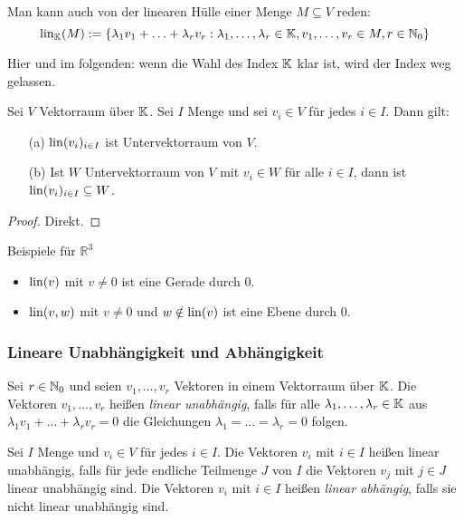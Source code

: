 Man kann auch von der linearen Hülle einer Menge $ M \subseteq V $ reden:
\begin{equation}
\operatorname{lin}_\mathbb K(M) := \{ \lambda_1 v_1 + \ldots + \lambda_r v_r : \lambda_1, \ldots, \lambda_r \in \mathbb K, v_1, \ldots, v_r \in M, r \in \mathbb N_0 \}
\end{equation}

Hier und im folgenden: wenn die Wahl des Index $ \mathbb K $ klar ist, wird der Index weg gelassen.


\begin{propn}
	Sei $ V $ Vektorraum über $ \mathbb K $. Sei $ I $ Menge und sei $ v_i \in V $ für jedes $ i \in I $. Dann gilt:
	\begin{itemize}
		\item[(a)]
			$ \operatorname{lin} (v_i)_{i \in I} $ ist Untervektorraum von $ V $.
		\item[(b)]
			Ist $ W $ Untervektorraum von $ V $ mit $ v_i \in W $ für alle $ i \in I $, dann ist $ \operatorname{lin} (v_i)_{i \in I} \subseteq W $.
	\end{itemize}
\end{propn}
\begin{proof}
	Direkt.
\end{proof}


\begin{bsp} Beispiele für $ \mathbb{R}^3 $
\begin{itemize}
	\item
		$ \operatorname{lin} (v) $ mit $ v \neq 0 $ ist eine Gerade durch $ 0 $.
	\item
		$ \operatorname{lin} (v,w) $ mit $ v \neq 0 $ und $ w \notin \operatorname{lin}(v) $ ist eine Ebene durch $ 0 $.
\end{itemize}
\end{bsp} 


\subsubsection{Lineare Unabhängigkeit und Abhängigkeit}

Sei $ r \in \mathbb N_0 $ und seien $ v_1, \ldots, v_r $ Vektoren in einem Vektorraum über $ \mathbb K $. Die Vektoren $ v_1, \ldots, v_r $ heißen \emph{linear unabhängig}, falls für alle $ \lambda_1, \ldots, \lambda_r \in \mathbb K $ aus $ \lambda_1v_1 + \ldots + \lambda_rv_r = 0 $ die Gleichungen $ \lambda_1 = \ldots = \lambda_r = 0 $ folgen.

Sei $ I $ Menge und $ v_i \in V $ für jedes $ i \in I $. Die Vektoren $ v_i $ mit $ i \in I $ heißen linear unabhängig, falls für jede endliche Teilmenge $ J $ von $ I $ die Vektoren $ v_j $ mit $ j \in J $ linear unabhängig sind. Die Vektoren $ v_i $ mit $ i \in I $ heißen \emph{linear abhängig}, falls sie nicht linear unabhängig sind. 

